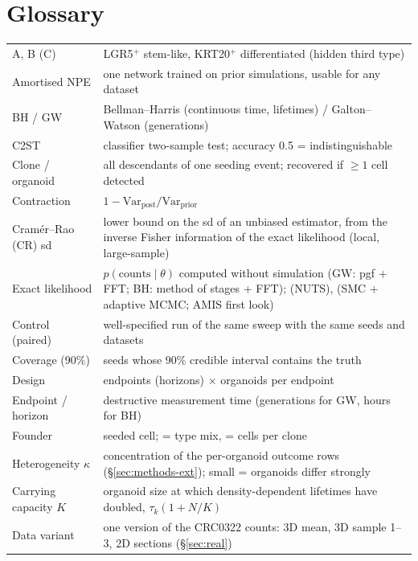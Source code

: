 \documentclass[10pt,a4paper]{article}
\newcommand{\code}[1]{\texttt{\detokenize{#1}}}
\begin{document}
\section{Glossary}\label{sec:glossary}
\begin{center}\footnotesize
\begin{tabularx}{\linewidth}{@{}p{3.3cm}X@{}}\toprule
A, B (C) & LGR5$^+$ stem-like, KRT20$^+$ differentiated (hidden third type) \\
Amortised NPE & one network trained on prior simulations, usable for any dataset \\
BH / GW & Bellman--Harris (continuous time, lifetimes) / Galton--Watson (generations) \\
C2ST & classifier two-sample test; accuracy 0.5 = indistinguishable \\
Clone / organoid & all descendants of one seeding event; recovered if $\ge 1$ cell detected \\
Contraction & $1-\mathrm{Var}_\text{post}/\mathrm{Var}_\text{prior}$ \\
Cram\'er--Rao (CR) sd & lower bound on the sd of an unbiased estimator, from the inverse Fisher information of the exact likelihood (local, large-sample) \\
Exact likelihood & $p(\text{counts}\mid\theta)$ computed without simulation (GW: pgf + FFT; BH: method of stages + FFT); \code{exact_gw} (NUTS), \code{exact_bh} (SMC + adaptive MCMC; AMIS first look) \\
Control (paired) & well-specified run of the same sweep with the same seeds and datasets \\
Coverage (90\%) & seeds whose 90\% credible interval contains the truth \\
Design & endpoints (horizons) $\times$ organoids per endpoint \\
Endpoint / horizon & destructive measurement time (generations for GW, hours for BH) \\
Founder & seeded cell; \code{founder} = type mix, \code{founder_size} = cells per clone \\
Heterogeneity $\kappa$ & concentration of the per-organoid outcome rows (\S\ref{sec:methods-ext}); small = organoids differ strongly \\
Carrying capacity $K$ & organoid size at which density-dependent lifetimes have doubled, $\tau_k(1+N/K)$ \\
Data variant & one version of the CRC0322 counts: 3D mean, 3D sample 1--3, 2D sections (\S\ref{sec:real}) \\

\end{tabularx}
\end{center}
\end{document}
